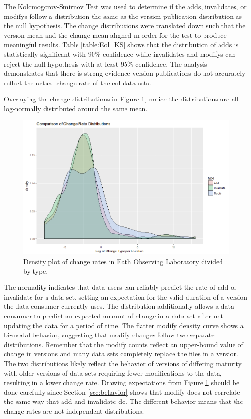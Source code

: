 The Kolomogorov-Smirnov Test was used to determine if the \glspl{add}, \glspl{invalidate}, or \glspl{modify} follow a distribution the same as the version publication distribution as the null hypothesis.  
The change distributions were translated down such that the \gls{version} mean and the \gls{change} mean aligned in order for the test to produce meaningful results.
Table \ref{table:Eol_KS} shows that the distribution of \glspl{add} is statistically significant with 90\% confidence while \glspl{invalidate} and \glspl{modify} can reject the null hypothesis with at least 95\% confidence.
The analysis demonstrates that there is strong evidence version publications do not accurately reflect the actual change rate of the \gls{eol} data sets.

Overlaying the change distributions in Figure \ref{EOL_AIM_Rate}, notice the distributions are all log-normally distributed around the same mean.
\begin{figure}%
	\centering
	\includegraphics[scale=.6]{figures/Eol_AIM_Rate.png}
	\caption[Density plot of change rates in Eath Observing Laboratory divided by type.]{Density plot of change rates in Eath Observing Laboratory divided by type.}
	\label{EOL_AIM_Rate}
\end{figure}
The normality indicates that data users can reliably predict the rate of \gls{add} or \gls{invalidate} for a data set, setting an expectation for the valid duration of a \gls{version} the data consumer currently uses.
The distribution additionally allows a data consumer to predict an expected amount of \gls{change} in a data set after not updating the data for a period of time.
The flatter \gls{modify} density curve shows a bi-modal behavior, suggesting that \gls{modify} changes follow two separate distributions.
Remember that the \gls{modify} counts reflect an upper-bound value of \gls{change} in \glspl{version} and many data sets completely replace the files in a \gls{version}.
The two distributions likely reflect the behavior of \glspl{version} of differing maturity with older versions of data sets requiring fewer modifications to the data, resulting in a lower change rate.
Drawing expectations from Figure \ref{EOL_AIM_Rate} should be done carefully since Section \ref{sec:behavior} shows that \gls{modify} does not correlate the same way that \gls{add} and \gls{invalidate} do.
The different behavior means that the change rates are not independent distributions.

